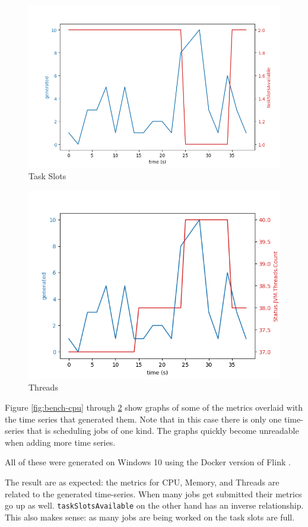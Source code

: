 \begin{figure}
   \centering
   \includegraphics[scale=0.60]{figures/task-slots.png}
\caption{Task Slots}    
\label{fig:bench-taks}
\end{figure}

\begin{figure}
   \centering
   \includegraphics[scale=0.70]{figures/threads.png}
\caption{Threads}    
\label{fig:bench-threads}
\end{figure}

Figure \ref{fig:bench-cpu} through \ref{fig:bench-threads} show graphs of some of the metrics overlaid with the time series that generated them. Note that in this case there is only one time-series that is scheduling jobs of one kind. The graphs quickly become unreadable when adding more time series. 

All of these were generated on Windows 10 using the Docker version of Flink \parencite{flinkdocker}.

The result are as expected: the metrics for CPU, Memory, and Threads are related to the generated time-series. When many jobs get submitted their metrics go up as well. \texttt{taskSlotsAvailable} on the other hand has an inverse relationship. This also makes sense: as many jobs are being worked on the task slots are full. 